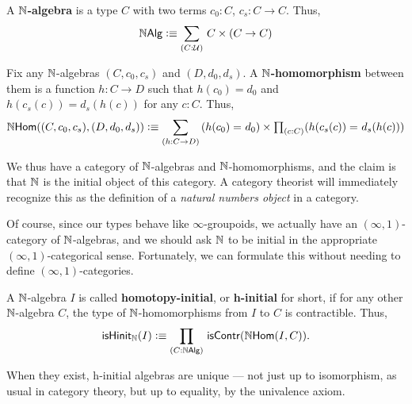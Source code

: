 \begin{defn}
A \textbf{$\mathbb{N}$-algebra} is a type $C$ with two terms $c_0 : C$, $c_s : C \to C$. Thus,
\begin{align*}
\nalg \defeq \sm {C : \type} C \times (C \to C)
\end{align*}
\end{defn}

\begin{defn}
Fix any $\mathbb{N}$-algebras $(C,c_0,c_s)$ and $(D,d_0,d_s)$. A \textbf{$\mathbb{N}$-homomorphism} between them is a function $h : C \to D$ such that $h(c_0) = d_0$ and $h(c_s(c)) = d_s(h(c))$ for any $c : C$. Thus,
\begin{equation*}
\nhom((C,c_0,c_s),(D,d_0,d_s)) \defeq
 \dsm {h : C \to D} (\id{h(c_0)}{d_0}) \times \tprd{c:C} (\id{h(c_s(c))}{d_s(h(c))})
\end{equation*}
\end{defn}

We thus have a category of $\mathbb{N}$-algebras and $\mathbb{N}$-homomorphisms, and the claim is that $\mathbb{N}$ is the initial object of this category.
A category theorist will immediately recognize this as the definition of a \emph{natural numbers object} in a category.

Of course, since our types behave like $\infty$-groupoids, we actually have an $(\infty,1)$-category of $\mathbb{N}$-algebras, and we should ask $\mathbb{N}$ to be initial in the appropriate $(\infty,1)$-categorical sense.
Fortunately, we can formulate this without needing to define $(\infty,1)$-categories.

\begin{defn}
A $\mathbb{N}$-algebra $I$ is called \textbf{homotopy-initial}, or \textbf{h-initial} for short, if for any other $\mathbb{N}$-algebra $C$, the type of $\mathbb{N}$-homomorphisms from $I$ to $C$ is contractible. Thus,
\begin{align*}
\ishinitn (I) \defeq \prd{C : \nalg} \iscontr(\nhom(I,C)).
\end{align*}
\end{defn}

When they exist, h-initial algebras are unique --- not just up to isomorphism, as usual in category theory, but up to equality, by the univalence axiom.

